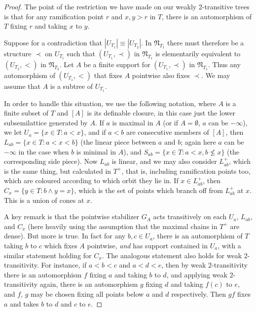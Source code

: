\documentclass[10pt,a4paper]{amsart}
\begin{document}
\begin{proof}  The point of the restriction we have made on our weakly 2-transitive trees is that for any
ramification point $r$ and $x, y > r$ in $T$, there is an automorphism of $T$ fixing $r$ and taking $x$ to $y$.

Suppose for a contradiction that $|U_{T_1}| \equiv |U_{T_2}|$. In ${\mathfrak N}_{T_1}$ there must therefore be a 
structure $\prec$ on $U_{T_1}$ such that $(U_{T_1}, \prec)$ in ${\mathfrak N}_{T_1}$ is elementarily equivalent to 
$(U_{T_2}, <)$ in ${\mathfrak N}_{T_2}$. Let $A$ be a finite support for $(U_{T_1}, \prec)$ in ${\mathfrak N}_{T_1}$. 
Thus any automorphism of $(U_{T_1}, <)$ that fixes $A$ pointwise also fixes $\prec$. We may assume that $A$ is a 
subtree of $U_{T_1}$.

In order to handle this situation, we use the following notation, where $A$ is a finite subset of $T$ and $[A]$ 
is its definable closure, in this case just the lower subsemilattice generated by $A$. If $a$ is maximal in $A$ 
(or if $A = \emptyset$, $a$ can be $-\infty$), we let $U_a = \{x \in T: a < x\}$, and if $a < b$ are consecutive 
members of $[A]$, then $L_{ab} = \{x \in T: a < x < b\}$ (the linear piece between $a$ and $b$; again here $a$ 
can be $-\infty$ in the case when $b$ is minimal in $A$), and $S_{ab} = \{x \in T: a < x, b \not \le x\}$ (the 
corresponding side piece). Now $L_{ab}$ is linear, and we may also consider $L_{ab}^+$, which is the same thing, 
but calculated in $T^+$, that is, including ramification points too, which are coloured according to which orbit 
they lie in. If $x \in L_{ab}^+$, then $C_x = \{y \in T: b \wedge y = x\}$, which is the set of points which 
branch off from $L_{ab}^+$ at $x$. This is a union of cones at $x$.

A key remark is that the pointwise stabilizer $G_A$ acts transitively on each $U_a$, $L_{ab}$, and $C_x$ (here heavily 
using the assumption that the maximal chains in $T^+$ are dense). But more is true. 
In fact for any $b, c \in U_a$, there is an automorphism of $T$ taking $b$ to $c$ which fixes $A$ pointwise, {\em and} has
support contained in $U_a$, with a similar statement holding for $C_x$. The analogous statement also holds for
weak 2-transitivity. For instance, if $a < b < c$ and $a < d < e$, then by weak 2-transitivity there is an 
automorphism $f$ fixing $a$ and taking $b$ to $d$, and applying weak 2-transitivity again, there is an automorphism
$g$ fixing $d$ and taking $f(c)$ to $e$, and $f$, $g$ may be chosen fixing all points below $a$ and $d$ respectively.
Then $gf$ fixes $a$ and takes $b$ to $d$ and $c$ to $e$.


\end{proof}
\end{document}
